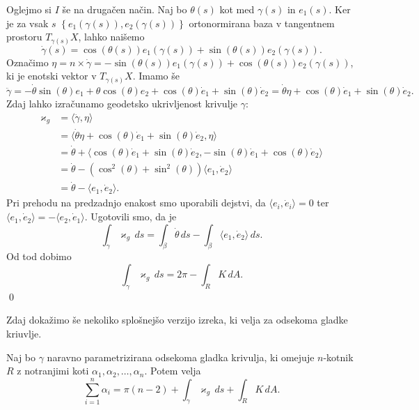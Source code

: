 Oglejmo si $I$ še na drugačen način. Naj bo $\theta(s)$ kot med $\gamma(s)$ in $e_1(s)$. Ker je za vsak $s$ $\left\{ e_1(\gamma(s)), e_2(\gamma(s))\right\}$ ortonormirana baza v tangentnem prostoru
$T_{\gamma(s)}X$, lahko naišemo \begin{equation*}
\dot{\gamma}(s) = \cos(\theta(s))e_1(\gamma(s)) + \sin(\theta(s))e_2(\gamma(s)).
\end{equation*}  
Označimo $\eta = n \times \dot{\gamma} = - \sin(\theta(s)) e_1(\gamma(s)) + \cos(\theta(s)) e_2(\gamma(s))$, ki je enotski vektor v  $T_{\gamma(s)}X$.
Imamo še \begin{equation*}
\ddot{\gamma} = -\dot{\theta} \sin(\theta) e_1 + \theta \cos(\theta) e_2 +  \cos(\theta)\dot{e}_1 + \sin(\theta)\dot{e}_2 = \dot{\theta} \eta + \cos(\theta) \dot{e}_1 + \sin(\theta) \dot{e}_2.  
\end{equation*}  
Zdaj lahko izračunamo geodetsko ukrivljenost krivulje $\gamma$: \begin{align*}
    \varkappa_g &= \langle \ddot{\gamma}, \eta \rangle  \\
     &= \langle \dot{\theta} \eta + \cos(\theta) \dot{e}_1 + \sin(\theta) \dot{e}_2, \eta  \rangle \\
     &= \dot{\theta} + \langle \cos(\theta) \dot{e}_1 + \sin(\theta)\dot{e}_2, - \sin(\theta) \dot{e}_1 + \cos(\theta) \dot{e}_2 \rangle \\
     &= \dot{\theta} - (\cos^2(\theta) + \sin^2(\theta) ) \langle e_1, \dot{e}_2  \rangle \\
     &= \dot{\theta} - \langle e_1, \dot{e}_2  \rangle.  
\end{align*}
Pri prehodu na predzadnjo enakost smo uporabili dejstvi, da $\langle e_i, \dot{e}_i \rangle = 0$ ter $\langle e_1, \dot{e}_2 \rangle = - \langle e_2, \dot{e}_1 \rangle$.
Ugotovili smo, da je \begin{equation*}
\int_{\gamma} \varkappa_g  \, ds = \int_{\beta} \dot{\theta}  \, ds - \int_{\beta} \langle e_1, \dot{e}_2 \rangle   \, ds.  
\end{equation*}  
Od tod dobimo \begin{equation*}
    \int_{\gamma} \varkappa_g  \, ds  = 2 \pi  - \int_{R}  K \, dA.  
\end{equation*}  
\qed
  
Zdaj dokažimo še nekoliko splošnejšo verzijo izreka, ki velja za odsekoma gladke kriuvlje.

\begin{izrek}
\label{izr_odsekoma_gladke_krivulje_GB}
Naj bo $\gamma$ naravno parametrizirana odsekoma gladka krivulja, ki omejuje $n$-kotnik $R$ z notranjimi koti $\alpha_1, \alpha_2, \ldots, \alpha_n$. Potem velja \begin{equation*}
\sum_{i=1}^{n} \alpha_i = \pi(n-2) + \int_{\gamma} \varkappa_g  \, ds + \int_{R} K \, dA.  
\end{equation*}  
\end{izrek}

